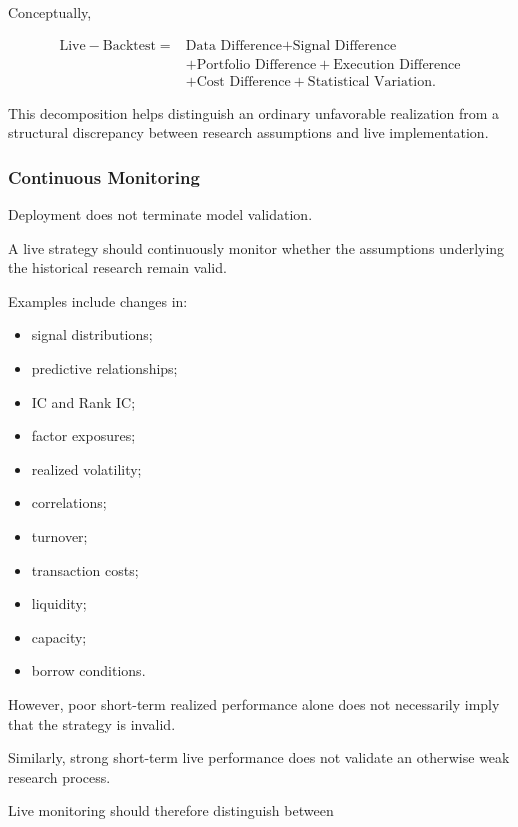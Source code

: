\documentclass[11pt,a4paper]{article}
\begin{document}
Conceptually,

\begin{equation}
\boxed{
\begin{aligned}
\text{Live}
-
\text{Backtest}
=
&
\text{Data Difference}
+
\text{Signal Difference}
\\
&+
\text{Portfolio Difference}
+
\text{Execution Difference}
\\
&+
\text{Cost Difference}
+
\text{Statistical Variation}.
\end{aligned}
}
\end{equation}

This decomposition helps distinguish an ordinary unfavorable realization from a
structural discrepancy between research assumptions and live implementation.


\subsubsection{Continuous Monitoring}

Deployment does not terminate model validation.

A live strategy should continuously monitor whether the assumptions underlying
the historical research remain valid.

Examples include changes in:

\begin{itemize}
    \item signal distributions;
    \item predictive relationships;
    \item IC and Rank IC;
    \item factor exposures;
    \item realized volatility;
    \item correlations;
    \item turnover;
    \item transaction costs;
    \item liquidity;
    \item capacity;
    \item borrow conditions.
\end{itemize}

However, poor short-term realized performance alone does not necessarily imply
that the strategy is invalid.

Similarly, strong short-term live performance does not validate an otherwise
weak research process.

Live monitoring should therefore distinguish between
\end{document}
